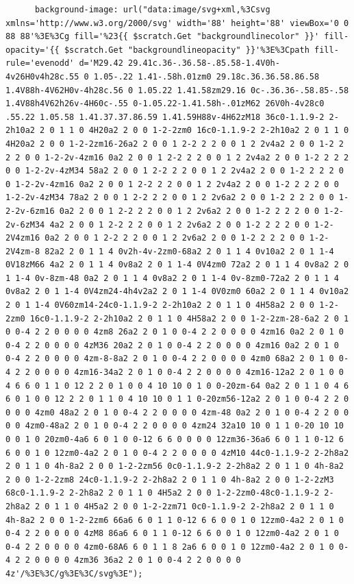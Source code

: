\documentclass[11pt]{article}
\begin{document}
\begin{enumerate}
\begin{verbatim}
      background-image: url("data:image/svg+xml,%3Csvg xmlns='http://www.w3.org/2000/svg' width='88' height='88' viewBox='0 0 88 88'%3E%3Cg fill='%23{{ $scratch.Get "backgroundlinecolor" }}' fill-opacity='{{ $scratch.Get "backgroundlineopacity" }}'%3E%3Cpath fill-rule='evenodd' d='M29.42 29.41c.36-.36.58-.85.58-1.4V0h-4v26H0v4h28c.55 0 1.05-.22 1.41-.58h.01zm0 29.18c.36.36.58.86.58 1.4V88h-4V62H0v-4h28c.56 0 1.05.22 1.41.58zm29.16 0c-.36.36-.58.85-.58 1.4V88h4V62h26v-4H60c-.55 0-1.05.22-1.41.58h-.01zM62 26V0h-4v28c0 .55.22 1.05.58 1.41.37.37.86.59 1.41.59H88v-4H62zM18 36c0-1.1.9-2 2-2h10a2 2 0 1 1 0 4H20a2 2 0 0 1-2-2zm0 16c0-1.1.9-2 2-2h10a2 2 0 1 1 0 4H20a2 2 0 0 1-2-2zm16-26a2 2 0 0 1 2-2 2 2 0 0 1 2 2v4a2 2 0 0 1-2 2 2 2 0 0 1-2-2v-4zm16 0a2 2 0 0 1 2-2 2 2 0 0 1 2 2v4a2 2 0 0 1-2 2 2 2 0 0 1-2-2v-4zM34 58a2 2 0 0 1 2-2 2 2 0 0 1 2 2v4a2 2 0 0 1-2 2 2 2 0 0 1-2-2v-4zm16 0a2 2 0 0 1 2-2 2 2 0 0 1 2 2v4a2 2 0 0 1-2 2 2 2 0 0 1-2-2v-4zM34 78a2 2 0 0 1 2-2 2 2 0 0 1 2 2v6a2 2 0 0 1-2 2 2 2 0 0 1-2-2v-6zm16 0a2 2 0 0 1 2-2 2 2 0 0 1 2 2v6a2 2 0 0 1-2 2 2 2 0 0 1-2-2v-6zM34 4a2 2 0 0 1 2-2 2 2 0 0 1 2 2v6a2 2 0 0 1-2 2 2 2 0 0 1-2-2V4zm16 0a2 2 0 0 1 2-2 2 2 0 0 1 2 2v6a2 2 0 0 1-2 2 2 2 0 0 1-2-2V4zm-8 82a2 2 0 1 1 4 0v2h-4v-2zm0-68a2 2 0 1 1 4 0v10a2 2 0 1 1-4 0V18zM66 4a2 2 0 1 1 4 0v8a2 2 0 1 1-4 0V4zm0 72a2 2 0 1 1 4 0v8a2 2 0 1 1-4 0v-8zm-48 0a2 2 0 1 1 4 0v8a2 2 0 1 1-4 0v-8zm0-72a2 2 0 1 1 4 0v8a2 2 0 1 1-4 0V4zm24-4h4v2a2 2 0 1 1-4 0V0zm0 60a2 2 0 1 1 4 0v10a2 2 0 1 1-4 0V60zm14-24c0-1.1.9-2 2-2h10a2 2 0 1 1 0 4H58a2 2 0 0 1-2-2zm0 16c0-1.1.9-2 2-2h10a2 2 0 1 1 0 4H58a2 2 0 0 1-2-2zm-28-6a2 2 0 1 0 0-4 2 2 0 0 0 0 4zm8 26a2 2 0 1 0 0-4 2 2 0 0 0 0 4zm16 0a2 2 0 1 0 0-4 2 2 0 0 0 0 4zM36 20a2 2 0 1 0 0-4 2 2 0 0 0 0 4zm16 0a2 2 0 1 0 0-4 2 2 0 0 0 0 4zm-8-8a2 2 0 1 0 0-4 2 2 0 0 0 0 4zm0 68a2 2 0 1 0 0-4 2 2 0 0 0 0 4zm16-34a2 2 0 1 0 0-4 2 2 0 0 0 0 4zm16-12a2 2 0 1 0 0 4 6 6 0 1 1 0 12 2 2 0 1 0 0 4 10 10 0 1 0 0-20zm-64 0a2 2 0 1 1 0 4 6 6 0 1 0 0 12 2 2 0 1 1 0 4 10 10 0 1 1 0-20zm56-12a2 2 0 1 0 0-4 2 2 0 0 0 0 4zm0 48a2 2 0 1 0 0-4 2 2 0 0 0 0 4zm-48 0a2 2 0 1 0 0-4 2 2 0 0 0 0 4zm0-48a2 2 0 1 0 0-4 2 2 0 0 0 0 4zm24 32a10 10 0 1 1 0-20 10 10 0 0 1 0 20zm0-4a6 6 0 1 0 0-12 6 6 0 0 0 0 12zm36-36a6 6 0 1 1 0-12 6 6 0 0 1 0 12zm0-4a2 2 0 1 0 0-4 2 2 0 0 0 0 4zM10 44c0-1.1.9-2 2-2h8a2 2 0 1 1 0 4h-8a2 2 0 0 1-2-2zm56 0c0-1.1.9-2 2-2h8a2 2 0 1 1 0 4h-8a2 2 0 0 1-2-2zm8 24c0-1.1.9-2 2-2h8a2 2 0 1 1 0 4h-8a2 2 0 0 1-2-2zM3 68c0-1.1.9-2 2-2h8a2 2 0 1 1 0 4H5a2 2 0 0 1-2-2zm0-48c0-1.1.9-2 2-2h8a2 2 0 1 1 0 4H5a2 2 0 0 1-2-2zm71 0c0-1.1.9-2 2-2h8a2 2 0 1 1 0 4h-8a2 2 0 0 1-2-2zm6 66a6 6 0 1 1 0-12 6 6 0 0 1 0 12zm0-4a2 2 0 1 0 0-4 2 2 0 0 0 0 4zM8 86a6 6 0 1 1 0-12 6 6 0 0 1 0 12zm0-4a2 2 0 1 0 0-4 2 2 0 0 0 0 4zm0-68A6 6 0 1 1 8 2a6 6 0 0 1 0 12zm0-4a2 2 0 1 0 0-4 2 2 0 0 0 0 4zm36 36a2 2 0 1 0 0-4 2 2 0 0 0 0 4z'/%3E%3C/g%3E%3C/svg%3E");

\end{verbatim}
\end{enumerate}
\end{document}
